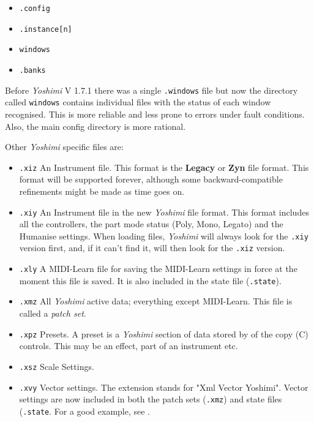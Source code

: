    \begin{itemize}
      \item \texttt{.config}
      \item \texttt{.instance[n]}
      \item \texttt{windows}
      \item \texttt{.banks}
   \end{itemize}

   Before \textsl{Yoshimi} V 1.7.1 there was a single \texttt{.windows}
   file but now the directory called \texttt{windows} contains individual
   files with the status of each window recognised. This is more reliable and
   less prone to errors under fault conditions. Also, the main config
   directory is more rational.

   Other \textsl{Yoshimi} specific files are:

   \begin{itemize}
      \item \texttt{.xiz}
         An Instrument file.  This format is the \textbf{Legacy} or \textbf{Zyn}
         file format.  This format will be supported forever, although some
         backward-compatible refinements might be made as time goes on.
      \item \texttt{.xiy}
         An Instrument file in the new \textsl{Yoshimi} file format.
         This format includes all the
         controllers, the part mode status (Poly, Mono, Legato) and the
         Humanise settings.
         When loading files, \textsl{Yoshimi} will always look for
         the \texttt{.xiy} version first, and,
         if it can't find it, will then look for the \texttt{.xiz} version.
      \item \texttt{.xly}
         A MIDI-Learn file for saving the MIDI-Learn settings in force at the
         moment this file is saved.  It is also included in the state file
         (\texttt{.state}).
      \item \texttt{.xmz}
         All \textsl{Yoshimi} active data; everything except MIDI-Learn.
         This file is called a \textsl{patch set}.
      \item \texttt{.xpz}
         Presets.
         A preset is a \textsl{Yoshimi} section of data stored by of the copy
         (C) controls. This may be an effect, part of an instrument etc.
      \item \texttt{.xsz}
         Scale Settings.
      \item \texttt{.xvy}
         Vector settings. The extension stands for "Xml Vector Yoshimi".
         Vector settings are now included in both the patch sets
         (\texttt{.xmz}) and state files (\texttt{.state}.
         For a good example, see .
   \end{itemize}

